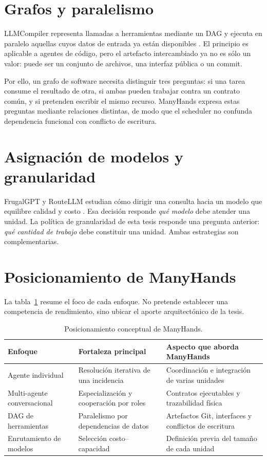 \section{Grafos y paralelismo}

LLMCompiler representa llamadas a herramientas mediante un DAG y ejecuta en
paralelo aquellas cuyos datos de entrada ya están disponibles
\cite{kim2024llmcompiler}. El principio es aplicable a agentes de código, pero
el artefacto intercambiado ya no es sólo un valor: puede ser un conjunto de
archivos, una interfaz pública o un commit.

Por ello, un grafo de software necesita distinguir tres preguntas: si una tarea
consume el resultado de otra, si ambas pueden trabajar contra un contrato
común, y si pretenden escribir el mismo recurso. ManyHands expresa estas
preguntas mediante relaciones distintas, de modo que el scheduler no confunda
dependencia funcional con conflicto de escritura.

\section{Asignación de modelos y granularidad}

FrugalGPT y RouteLLM estudian cómo dirigir una consulta hacia un modelo que
equilibre calidad y costo \cite{chen2023frugalgpt,ong2024routellm}. Esa decisión
responde \emph{qué modelo} debe atender una unidad. La política de granularidad
de esta tesis responde una pregunta anterior: \emph{qué cantidad de trabajo}
debe constituir una unidad. Ambas estrategias son complementarias.

\section{Posicionamiento de ManyHands}

La tabla~\ref{tab:estado-del-arte} resume el foco de cada enfoque. No pretende
establecer una competencia de rendimiento, sino ubicar el aporte arquitectónico
de la tesis.

\begin{table}[htbp]
  \centering
  \caption{Posicionamiento conceptual de ManyHands.}
  \label{tab:estado-del-arte}
  \small
  \begin{tabularx}{\textwidth}{@{}p{2.8cm} X X@{}}
    \toprule
    \textbf{Enfoque} & \textbf{Fortaleza principal} & \textbf{Aspecto que aborda ManyHands} \\
    \midrule
    Agente individual & Resolución iterativa de una incidencia & Coordinación e integración de varias unidades \\
    Multi-agente conversacional & Especialización y cooperación por roles & Contratos ejecutables y trazabilidad física \\
    DAG de herramientas & Paralelismo por dependencias de datos & Artefactos Git, interfaces y conflictos de escritura \\
    Enrutamiento de modelos & Selección costo--capacidad & Definición previa del tamaño de cada unidad \\
    \bottomrule
  \end{tabularx}
\end{table}

